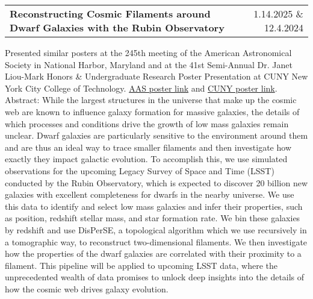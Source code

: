 \documentclass[a4paper,12pt]{article}
\makeatletter
\newenvironment{jobshort}[2]
    {
    \begin{tabularx}{\linewidth}{@{}X r@{}}
    {\raggedright\arraybackslash\nohyphens{#1}} & #2 \\[3.75pt]
    \end{tabularx}
    }
    {}
\makeatother
\begin{document}
\begin{jobshort}{\textbf{Reconstructing Cosmic Filaments around Dwarf Galaxies with the Rubin Observatory}}{1.14.2025 \& 12.4.2024}
Presented similar posters at the 245th meeting of the American Astronomical Society in National Harbor, Maryland and at the 41st Semi-Annual Dr. Janet Liou-Mark Honors \& Undergraduate Research Poster Presentation at CUNY New York City College of Technology. \href{https://aas245-aas.ipostersessions.com/Default.aspx?s=3B-03-9F-6A-6E-75-01-97-E0-FC-B1-F5-ED-BF-AB-40}{AAS poster link} and \href{https://academicworks.cuny.edu/ny_pubs/1222/}{CUNY poster link}.\\
Abstract: While the largest structures in the universe that make up the cosmic web are known to influence galaxy formation for massive galaxies, the details of which processes and conditions drive the growth of low mass galaxies remain unclear. Dwarf galaxies are particularly sensitive to the environment around them and are thus an ideal way to trace smaller filaments and then investigate how exactly they impact galactic evolution. To accomplish this, we use simulated observations for the upcoming Legacy Survey of Space and Time (LSST) conducted by the Rubin Observatory, which is expected to discover 20 billion new galaxies with excellent completeness for dwarfs in the nearby universe. We use this data to identify and select low mass galaxies and infer their properties, such as position, redshift stellar mass, and star formation rate. We bin these galaxies by redshift and use DisPerSE, a topological algorithm which we use recursively in a tomographic way, to reconstruct two-dimensional filaments. We then investigate how the properties of the dwarf galaxies are correlated with their proximity to a filament. This pipeline will be applied to upcoming LSST data, where the unprecedented wealth of data promises to unlock deep insights into the details of how the cosmic web drives galaxy evolution.
\end{jobshort}
\end{document}
